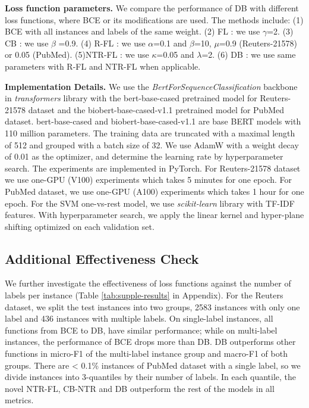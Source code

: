 \documentclass[11pt]{article}
\begin{document}
\textbf{Loss function parameters.} We compare the performance of DB with different loss functions, 
where BCE or its modifications are used.
The methods include: (1) BCE with all instances and labels of the same weight. (2) FL \citep{lin2017focal}: we use $\gamma$=2. (3) CB \citep{class-balanced-loss}: we use $\beta$ =0.9. (4) R-FL \citep{DBLoss}: we use $\alpha$=0.1 and $\beta$=10, $\mu$=0.9 (Reuters-21578) or 0.05 (PubMed). (5)NTR-FL \citep{DBLoss}: we use $\kappa$=0.05 and $\lambda$=2. (6) DB \citep{DBLoss}: we use same parameters with R-FL and NTR-FL when applicable.

\textbf{Implementation Details.} We use the \textit{BertForSequenceClassification} backbone in \textit{transformers} library \citep{wolf-etal-2020-transformers} with the bert-base-cased pretrained model  \citep{devlin2018bert} for Reuters-21578 dataset and the biobert-base-cased-v1.1 pretrained model  \citep{10.1093/bioinformatics/btz682} for PubMed dataset. bert-base-cased and biobert-base-cased-v1.1 are base BERT models with 110 million parameters. The training data are truncated with a maximal length of 512 and grouped with a batch size of 32. We use AdamW with a weight decay of 0.01 as the optimizer, and determine the learning rate by hyperparameter search. The experiments are implemented in PyTorch. For Reuters-21578 dataset we use one-GPU (V100) experiments which takes 5 minutes for one epoch. For PubMed dataset, we use one-GPU (A100) experiments which takes 1 hour for one epoch. For the SVM one-vs-rest model, we use \textit{scikit-learn} library \citep{scikit-learn} with TF-IDF features. With hyperparameter search, we apply the linear kernel and hyper-plane shifting optimized on each validation set.

\subsection{Additional Effectiveness Check} 
We further investigate the effectiveness of loss functions against the number of labels per instance (Table \ref{tab:supple-results} in Appendix). For the Reuters dataset, we split the test instances into two groups, 2583 instances with only one label and 436 instances with multiple labels. On single-label instances, all functions from BCE to DB, have similar performance; while on multi-label instances, the performance of BCE drops more than DB. DB outperforms other functions in micro-F1 of the multi-label instance group and macro-F1 of both groups. There are < 0.1\% instances of PubMed dataset with a single label, so we divide instances into 3-quantiles by their number of labels. In each quantile, the novel NTR-FL, CB-NTR and DB outperform the rest of the models in all metrics.
\end{document}
